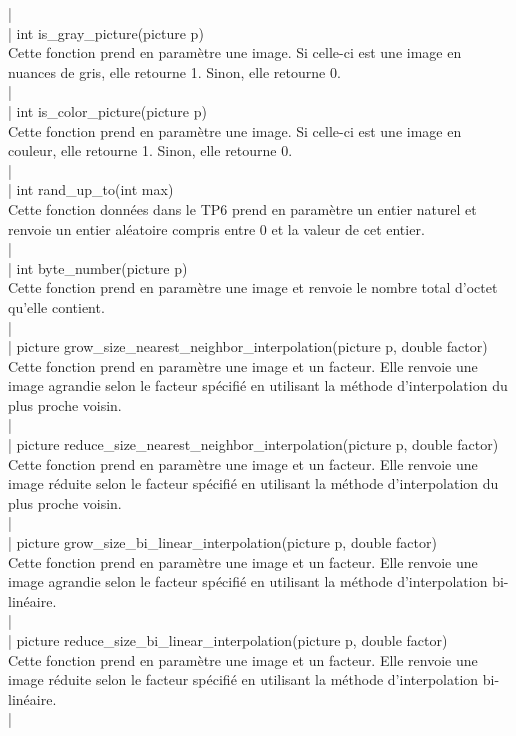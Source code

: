 \documentclass[12pt,a4paper]{article}
\begin{document}
|\\
| int is\_gray\_picture(picture p)\\
Cette fonction prend en paramètre une image. Si celle-ci est une image en nuances de gris, elle retourne 1. Sinon, elle retourne 0.\\
|\\
| int is\_color\_picture(picture p)\\
Cette fonction prend en paramètre une image. Si celle-ci est une image en couleur, elle retourne 1. Sinon, elle retourne 0.\\
|\\
| int rand\_up\_to(int max)\\
Cette fonction données dans le TP6 prend en paramètre un entier naturel et renvoie un entier aléatoire compris entre 0 et la valeur de cet entier.\\
|\\
| int byte\_number(picture p)\\
Cette fonction prend en paramètre une image et renvoie le nombre total d'octet qu'elle contient.\\
|\\
| picture grow\_size\_nearest\_neighbor\_interpolation(picture p, double factor)\\
Cette fonction prend en paramètre une image et un facteur. Elle renvoie une image agrandie selon le facteur spécifié en utilisant la méthode d'interpolation du plus proche voisin.\\
|\\
| picture reduce\_size\_nearest\_neighbor\_interpolation(picture p, double factor)\\
Cette fonction prend en paramètre une image et un facteur. Elle renvoie une image réduite selon le facteur spécifié en utilisant la méthode d'interpolation du plus proche voisin.\\
|\\
| picture grow\_size\_bi\_linear\_interpolation(picture p, double factor)\\
Cette fonction prend en paramètre une image et un facteur. Elle renvoie une image agrandie selon le facteur spécifié en utilisant la méthode d'interpolation bi-linéaire.\\
|\\
| picture reduce\_size\_bi\_linear\_interpolation(picture p, double factor)\\
Cette fonction prend en paramètre une image et un facteur. Elle renvoie une image réduite selon le facteur spécifié en utilisant la méthode d'interpolation bi-linéaire.\\
|\\
\end{document}
